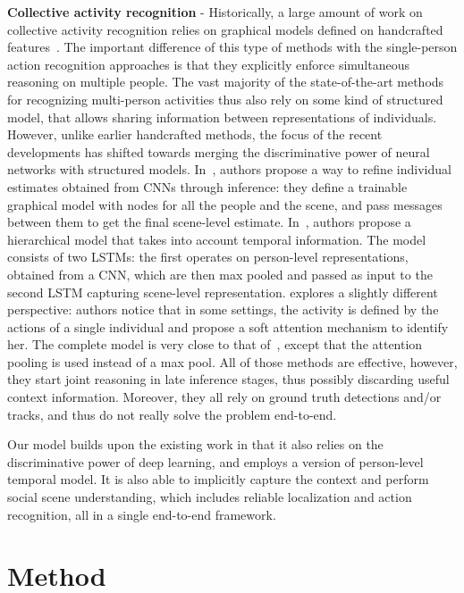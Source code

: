 \documentclass[10pt,twocolumn,letterpaper]{article}
\begin{document}
\noindent \textbf{Collective activity recognition} - Historically, a large
amount of work on collective activity recognition relies on graphical models
defined on handcrafted features~\cite{Choi2014, Choi2011, Amer2014}. The
important difference of this type of methods with the single-person action
recognition approaches is that they explicitly enforce simultaneous 
reasoning on multiple people. The vast majority of the state-of-the-art methods for
recognizing multi-person activities thus also rely on some kind of structured model,
that allows sharing information between representations of individuals.
However, unlike earlier handcrafted methods, the focus of the recent
developments has shifted towards merging the discriminative power of neural networks
with structured models. In~\cite{Deng2016}, authors propose a way to refine
individual estimates obtained from CNNs through inference: they define a
trainable graphical model with nodes for all the people and the scene, and pass
messages between them to get the final scene-level
estimate. In~\cite{Ibrahim2016}, authors propose a hierarchical model that takes
into account temporal information. The model consists of two LSTMs: the first
operates on person-level representations, obtained from a CNN, which are then
max pooled and passed as input to the second LSTM capturing scene-level
representation.  \cite{Ramanathan2016} explores a slightly different
perspective: authors notice that in some settings, the activity is defined by
the actions of a single individual and propose a soft attention mechanism to
identify her. The complete model is very close to that of~\cite{Ibrahim2016},
except that the attention pooling is used instead of a max pool. All of those
methods are effective, however, they start joint reasoning in late inference
stages, thus possibly
discarding useful context information. Moreover, they all rely on ground truth
detections and/or tracks, and thus do not really solve the problem end-to-end.

Our model builds upon the existing work in that it also relies on the
discriminative power of deep learning, and employs a version of person-level
temporal model. It is also able to implicitly capture the context and perform
social scene understanding, which includes reliable localization and action
recognition, all in a single end-to-end framework.
 \vspace{-0.1cm}
\section{Method}
\vspace{-0.15cm}
\end{document}
